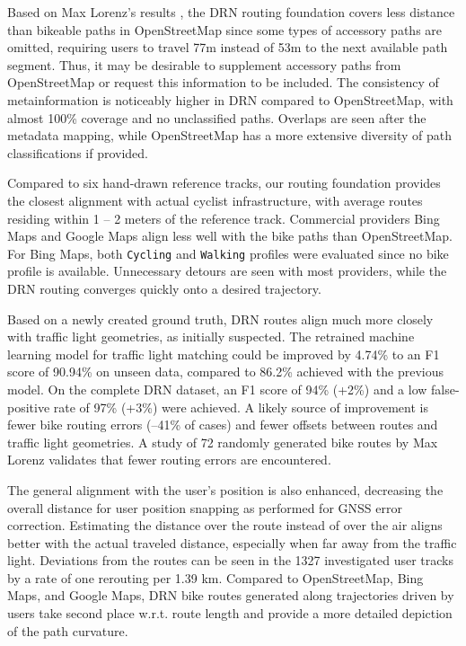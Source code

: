 \begin{Summary}
Based on Max Lorenz's results \cite{lorenz_2022}, the DRN routing foundation covers less distance than bikeable paths in OpenStreetMap since some types of accessory paths are omitted, requiring users to travel 77m instead of 53m to the next available path segment. Thus, it may be desirable to supplement accessory paths from OpenStreetMap or request this information to be included. The consistency of metainformation is noticeably higher in DRN compared to OpenStreetMap, with almost 100\% coverage and no unclassified paths. Overlaps are seen after the metadata mapping, while OpenStreetMap has a more extensive diversity of path classifications if provided.

Compared to six hand-drawn reference tracks, our routing foundation provides the closest alignment with actual cyclist infrastructure, with average routes residing within 1 -- 2 meters of the reference track. Commercial providers Bing Maps and Google Maps align less well with the bike paths than OpenStreetMap. For Bing Maps, both \texttt{Cycling} and \texttt{Walking} profiles were evaluated since no bike profile is available. Unnecessary detours are seen with most providers, while the DRN routing converges quickly onto a desired trajectory. 

Based on a newly created ground truth, DRN routes align much more closely with traffic light geometries, as initially suspected. The retrained machine learning model for traffic light matching could be improved by 4.74\% to an F1 score of 90.94\% on unseen data, compared to 86.2\% achieved with the previous model. On the complete DRN dataset, an F1 score of 94\% (+2\%) and a low false-positive rate of 97\% (+3\%) were achieved. A likely source of improvement is fewer bike routing errors (--41\% of cases) and fewer offsets between routes and traffic light geometries. A study of 72 randomly generated bike routes by Max Lorenz \cite{lorenz_2022} validates that fewer routing errors are encountered.

The general alignment with the user's position is also enhanced, decreasing the overall distance for user position snapping as performed for GNSS error correction. Estimating the distance over the route instead of over the air aligns better with the actual traveled distance, especially when far away from the traffic light. Deviations from the routes can be seen in the 1327 investigated user tracks by a rate of one rerouting per 1.39 km. Compared to OpenStreetMap, Bing Maps, and Google Maps, DRN bike routes generated along trajectories driven by users take second place w.r.t. route length and provide a more detailed depiction of the path curvature.
\end{Summary}

